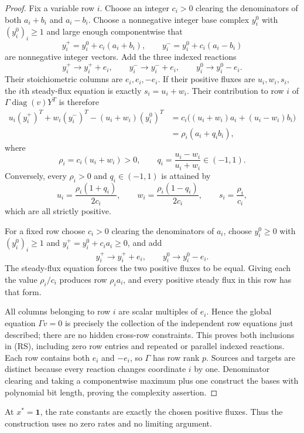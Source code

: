 \begin{proof}
Fix a variable row $i$. Choose an integer $c_i>0$ clearing the denominators
of both $a_i+b_i$ and $a_i-b_i$. Choose a nonnegative integer base complex
$y_i^0$ with $(y_i^0)_i\geq1$ and large enough componentwise that
\[
 y_i^+=y_i^0+c_i(a_i+b_i),\qquad
 y_i^-=y_i^0+c_i(a_i-b_i)
\]
are nonnegative integer vectors. Add the three indexed reactions
\[
 y_i^+\longrightarrow y_i^++e_i,\qquad
 y_i^-\longrightarrow y_i^-+e_i,\qquad
 y_i^0\longrightarrow y_i^0-e_i.
 \tag{RSi}
\]
Their stoichiometric columns are $e_i,e_i,-e_i$. If their positive fluxes
are $u_i,w_i,s_i$, the $i$th steady-flux equation is exactly
$s_i=u_i+w_i$. Their contribution to row $i$ of
$\Gamma\operatorname{diag}(v)Y^T$ is therefore
\begin{align*}
 u_i(y_i^+)^T+w_i(y_i^-)^T-(u_i+w_i)(y_i^0)^T
 &=c_i\bigl((u_i+w_i)a_i+(u_i-w_i)b_i\bigr)\\
 &=\rho_i(a_i+q_i b_i),
\end{align*}
where
\[
 \rho_i=c_i(u_i+w_i)>0,
 \qquad
 q_i=\frac{u_i-w_i}{u_i+w_i}\in(-1,1).
\]
Conversely, every $\rho_i>0$ and $q_i\in(-1,1)$ is attained by
\[
 u_i=\frac{\rho_i(1+q_i)}{2c_i},\qquad
 w_i=\frac{\rho_i(1-q_i)}{2c_i},\qquad
 s_i=\frac{\rho_i}{c_i},
\]
which are all strictly positive.

For a fixed row choose $c_i>0$ clearing the denominators of $a_i$, choose
$y_i^0\geq0$ with $(y_i^0)_i\geq1$ and
$y_i^+=y_i^0+c_i a_i\geq0$, and add
\[
 y_i^+\longrightarrow y_i^++e_i,
 \qquad
 y_i^0\longrightarrow y_i^0-e_i.
\]
The steady-flux equation forces the two positive fluxes to be equal. Giving
each the value $\rho_i/c_i$ produces row $\rho_i a_i$, and every positive
steady flux in this row has that form.

All columns belonging to row $i$ are scalar multiples of $e_i$. Hence the
global equation $\Gamma v=0$ is precisely the collection of the independent
row equations just described; there are no hidden cross-row constraints.
This proves both inclusions in (RS), including zero row entries and repeated
or parallel indexed reactions. Each row contains both $e_i$ and $-e_i$, so
$\Gamma$ has row rank $p$. Sources and targets are distinct because every
reaction changes coordinate $i$ by one. Denominator clearing and taking a
componentwise maximum plus one construct the bases with polynomial bit
length, proving the complexity assertion.
\end{proof}

At $x^*=\mathbf 1$, the rate constants are exactly the chosen positive
fluxes. Thus the construction uses no zero rates and no limiting argument.

